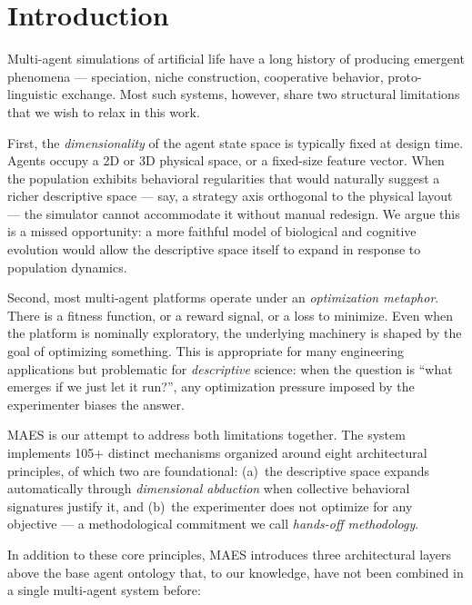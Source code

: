 \documentclass[11pt,a4paper]{article}
\begin{document}
\section{Introduction}

Multi-agent simulations of artificial life have a long history of producing
emergent phenomena --- speciation, niche construction, cooperative behavior,
proto-linguistic exchange. Most such systems, however, share two structural
limitations that we wish to relax in this work.

First, the \emph{dimensionality} of the agent state space is typically
fixed at design time. Agents occupy a 2D or 3D physical space, or a
fixed-size feature vector. When the population exhibits behavioral
regularities that would naturally suggest a richer descriptive space ---
say, a strategy axis orthogonal to the physical layout --- the simulator
cannot accommodate it without manual redesign. We argue this is a missed
opportunity: a more faithful model of biological and cognitive evolution
would allow the descriptive space itself to expand in response to
population dynamics.

Second, most multi-agent platforms operate under an \emph{optimization
metaphor}. There is a fitness function, or a reward signal, or a loss to
minimize. Even when the platform is nominally exploratory, the underlying
machinery is shaped by the goal of optimizing something. This is
appropriate for many engineering applications but problematic for
\emph{descriptive} science: when the question is ``what emerges if we
just let it run?'', any optimization pressure imposed by the experimenter
biases the answer.

MAES is our attempt to address both limitations together. The system
implements 105+ distinct mechanisms organized around eight architectural
principles, of which two are foundational: (a)~the descriptive space
expands automatically through \emph{dimensional abduction} when collective
behavioral signatures justify it, and (b)~the experimenter does not
optimize for any objective --- a methodological commitment we call
\emph{hands-off methodology}.

In addition to these core principles, MAES introduces three architectural
layers above the base agent ontology that, to our knowledge, have not
been combined in a single multi-agent system before:
\end{document}
